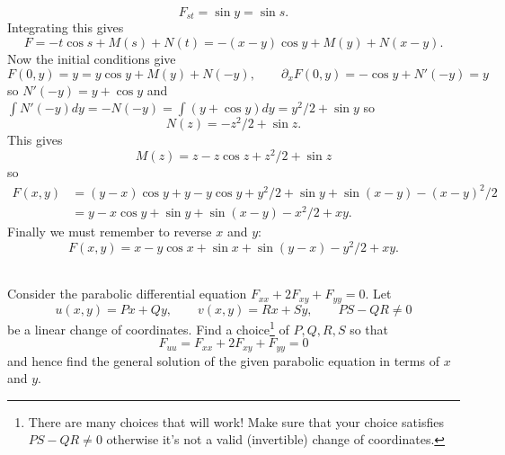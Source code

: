 \documentclass[12pt]{article}
\begin{document}
\begin{answer}
\begin{enumerate}[(a)]
\[F_{st}=\sin y=\sin s.\]
Integrating this gives
\[F=-t\cos s+M(s)+N(t)=-(x-y)\cos y+M(y)+N(x-y).\]
Now the initial conditions give
\[F(0,y)=y=y\cos y+M(y)+N(-y),\qquad \partial_xF(0,y)=-\cos y+N'(-y)=y\]
so $N'(-y)=y+\cos y$ and $\int N'(-y)dy=-N(-y)=\int (y+\cos y)dy=y^2/2+\sin y$ so
\[N(z)=-z^2/2+\sin z.\]
This gives
\[M(z)=z-z\cos z+z^2/2+\sin z\]
so
\begin{align*}
F(x,y)&=(y-x)\cos y+y-y\cos y+y^2/2+\sin y+\sin(x-y)-(x-y)^2/2\\
&=y-x\cos y+\sin y+\sin(x-y)-x^2/2+xy.
\end{align*}
Finally we must remember to reverse $x$ and $y$:
\[F(x,y)=x-y\cos x+\sin x+\sin(y-x)-y^2/2+xy.\]
\end{enumerate}
\end{answer}
\newpage
\fi

\bigskip

\begin{question}\ \\
Consider the parabolic differential equation $F_{xx}+2F_{xy}+F_{yy}=0$. Let
\[u(x,y)=Px+Qy,\qquad v(x,y)=Rx+Sy,\qquad PS-QR\neq 0\]
be a linear change of coordinates. Find a choice\footnote{There are many choices that will work! Make sure that your choice satisfies $PS-QR\neq 0$ otherwise it's not a valid (invertible) change of coordinates.} of $P,Q,R,S$ so that
\[F_{uu}=F_{xx}+2F_{xy}+F_{yy}=0\]
and hence find the general solution of the given parabolic equation in terms of $x$ and $y$.
\end{question}
\end{document}
